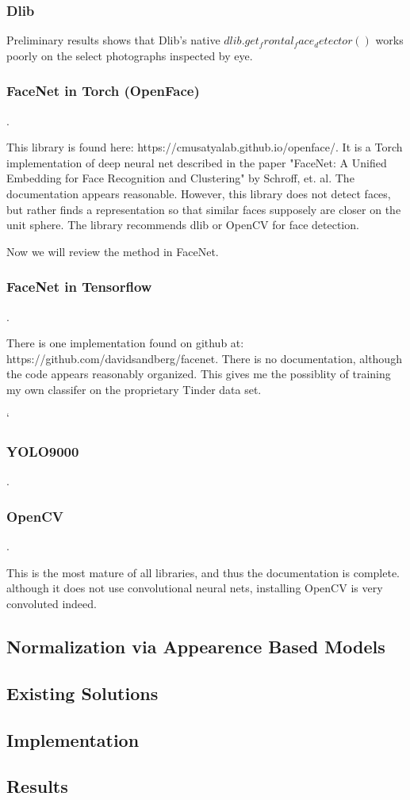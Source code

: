 \subsubsection{Dlib}

Preliminary results shows that Dlib's native $dlib.get_frontal_face_detector()$ works poorly on the select photographs inspected by eye. 

\subsubsection{FaceNet in Torch (OpenFace)}.

This library is found here: https://cmusatyalab.github.io/openface/. It is a Torch implementation of deep neural net described in the paper "FaceNet: A Unified Embedding for Face Recognition and Clustering" by Schroff, et. al. The documentation appears reasonable. However, this library does not detect faces, but rather finds a representation so that similar faces supposely are closer on the unit sphere. The library recommends dlib or OpenCV for face detection. 

Now we will review the method in FaceNet. 

\subsubsection{FaceNet in Tensorflow}.

There is one implementation found on github at: https://github.com/davidsandberg/facenet. There is no documentation, although the code appears reasonably organized. This gives me the possiblity of training my own classifer on the proprietary Tinder data set.

`\subsubsection{YOLO9000}.


\subsubsection{OpenCV}.

This is the most mature of all libraries, and thus the documentation is complete. although it does not use convolutional neural nets, installing OpenCV is very convoluted indeed. 

\subsection{Normalization via Appearence Based Models}



\subsection{Existing Solutions}


\subsection{Implementation}


\subsection{Results}



